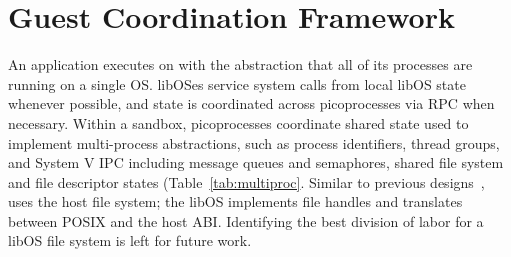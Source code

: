 \section{Guest Coordination Framework}
\label{sec:namespaces}



An application executes on \sysname{} 
with the abstraction that all of its processes are running on a single OS.
\sysname{} libOSes service system calls
from local libOS state whenever possible,
and state is coordinated across picoprocesses via RPC when necessary.
Within a sandbox, \sysname{} picoprocesses 
coordinate shared state used to implement multi-process
abstractions, such as process identifiers, thread groups, and 
System V IPC including message queues and semaphores, shared file system and file descriptor states (Table~\ref{tab:multiproc}.
Similar to previous designs~\citep{porter11drawbridge,baumann13bascule}, 
\sysname{} uses the host file system; 
the libOS implements file handles and translates between POSIX and the host ABI.
Identifying the best division of labor for a libOS file system is 
left for future work.

